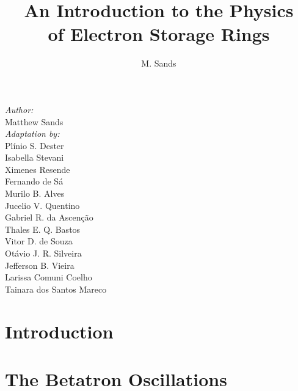 \documentclass[ebook,a4paper,12pt,oneside,openany]{memoir}
\title{An Introduction to the Physics\\ of Electron Storage Rings}
\author{M. Sands}
\numberwithin{equation}{chapter}
\begin{document}
\maketitle
\vspace{30mm}
\begin{flushright}
    \textit{Author:} \\
    \vspace{1mm}
        Matthew Sands \\
    \vspace{5mm}
    \textit{Adaptation by:} \\
    \vspace{1mm}
	Pl\'inio S. Dester \\
	Isabella Stevani \\
	Ximenes Resende \\
  Fernando de S\'a \\
  Murilo B. Alves \\
    Jucelio V. Quentino \\
    Gabriel R. da Ascenção \\
    Thales E. Q. Bastos \\
    Vitor D. de Souza \\
    Otávio J. R. Silveira \\
    Jefferson B. Vieira\\
    Larissa Comuni Coelho\\
    Tainara dos Santos Mareco\\
\end{flushright}

\thispagestyle{empty}

\newpage
\tableofcontents

\newpage


\chapter{Introduction} \label{ch:1}
    
    
    

\chapter{The Betatron Oscillations} \label{ch:2}
    
    
    
    
    
    
    
    
    
    
    
    
\end{document}
